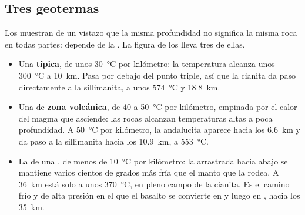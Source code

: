 \subsection{Tres geotermas}

Los  muestran de un vistazo que la misma profundidad no significa la
misma roca en todas partes: depende de la . La figura de los
 lleva tres de ellas.

\begin{itemize}
  \item Una  \textbf{típica}, de unos \qty{30}{\celsius} por
        kilómetro: la temperatura alcanza unos \qty{300}{\celsius} a
        \qty{10}{km}. Pasa por debajo del punto triple, así que la cianita da
        paso directamente a la sillimanita, a unos \qty{574}{\celsius} y
        \qty{18.8}{km}.
  \item Una  de \textbf{zona volcánica}, de 40 a \qty{50}{\celsius}
        por kilómetro, empinada por el calor del magma que asciende: las rocas
        alcanzan temperaturas altas a poca profundidad. A \qty{50}{\celsius}
        por kilómetro, la andalucita aparece hacia los \qty{6.6}{km} y da paso a
        la sillimanita hacia los \qty{10.9}{km}, a \qty{553}{\celsius}.
  \item La  de una \textbf{}, de menos de
        \qty{10}{\celsius} por kilómetro: la  arrastrada hacia
        abajo se mantiene varios cientos de grados más fría que el manto que la
        rodea. A \qty{36}{km} está solo a unos \qty{370}{\celsius}, en pleno
        campo de la cianita. Es el camino frío y de alta presión en el que el
        basalto se convierte en  y luego en , hacia los
        \qty{35}{km}.
\end{itemize}

